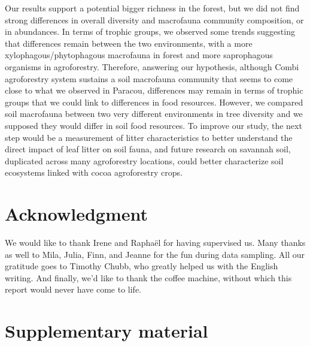 \documentclass[fleqn,10pt]{ArtEcoFoG} %
\begin{document}
Our results support a potential bigger richness in the forest, but we did not find strong differences in overall diversity and macrofauna community composition, or in abundances. In terms of trophic groups, we observed some trends suggesting that differences remain between the two environments, with a more xylophagous/phytophagous macrofauna in forest and more saprophagous organisms in agroforestry. Therefore, answering our hypothesis, although Combi agroforestry system sustains a soil macrofauna community that seems to come close to what we observed in Paracou, differences may remain in terms of trophic groups that we could link to differences in food resources. However, we compared soil macrofauna between two very different environments in tree diversity and we supposed they would differ in soil food resources. To improve our study, the next step would be a measurement of litter characteristics to better understand the direct impact of leaf litter on soil fauna, and future research on savannah soil, duplicated across many agroforestry locations, could better characterize soil ecosystems linked with cocoa agroforestry crops.

\section{Acknowledgment}\label{acknowledgment}

We would like to thank Irene and Raphaël for having supervised us. Many thanks as well to Mila, Julia, Finn, and Jeanne for the fun during data sampling. All our gratitude goes to Timothy Chubb, who greatly helped us with the English writing. And finally, we'd like to thank the coffee machine, without which this report would never have come to life.

\newpage

\section{Supplementary material}\label{supplementary-material}

\setcounter{table}{0} \setcounter{figure}{0} \renewcommand{\thefigure}{S\arabic{figure}}

\scriptsize
\end{document}
